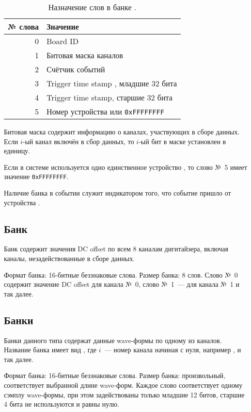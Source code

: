 \begin{table}[h]
\centering
\begin{tabular}{rl}
\hline\hline
№ слова & Значение \\
\hline

0 & Board ID \\
1 & Битовая маска каналов \\
2 & Счётчик событий \\
3 & Trigger time stamp \cite{CaenUM3051TS}, младшие 32 бита \\
4 & Trigger time stamp, старшие 32 бита \\
5 & Номер устройства или {\tt 0xFFFFFFFF} \\

\hline\hline
\end{tabular}
\caption{Назначение слов в банке .}
\label{tab-info-bank}
\end{table}

Битовая маска содержит информацию о каналах, участвующих в сборе данных. Если $i$-ый канал включён в сбор данных, то $i$-ый бит в маске установлен в единицу.

Если в системе используется одно единственное устройство \DEVICE{}, то слово №~5 имеет значение {\tt 0xFFFFFFFF}.

Наличие банка  в событии служит индикатором того, что событие пришло от устройства \DEVICE{}.

\subsection{Банк }

Банк содержит значения DC offset \cite{CaenUM3051AIS} по всем 8 каналам дигитайзера, включая каналы, незадействованные в сборе данных.

Формат банка: 16-битные беззнаковые слова. Размер банка: 8 слов. Слово №~0 содержит значение DC offset для канала №~0, слово №~1~--- для канала №~1 и так далее.

\subsection{Банки }

Банки данного типа  содержат данные wave-формы по одному из каналов. Название банка имеет вид , где $i$~--- номер канала начиная с нуля, например ,  и так далее.

Формат банка: 16-битные беззнаковые слова. Размер банка: произвольный, соответствует выбранной длине wave-форм. Каждое слово соответствует одному сэмплу wave-формы, при этом задействованы только младшие 12 битов, старшие 4 бита не используются и равны нулю.


